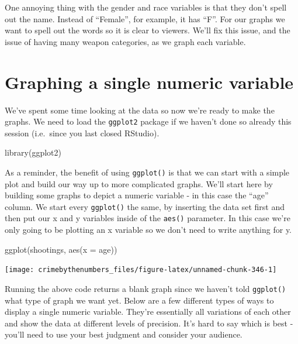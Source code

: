 \documentclass[
  a4paper,
]{krantz}
\makeatletter
\newenvironment{Shaded}{\begin{snugshade}}{\end{snugshade}}
\newcommand{\AttributeTok}[1]{\textcolor[rgb]{0.77,0.63,0.00}{#1}}
\newcommand{\FunctionTok}[1]{\textcolor[rgb]{0.00,0.00,0.00}{#1}}
\newcommand{\NormalTok}[1]{#1}
\newenvironment{kframe}{%
\medskip{}
\setlength{\fboxsep}{.8em}
 \def\at@end@of@kframe{}%
 \ifinner\ifhmode%
  \def\at@end@of@kframe{\end{minipage}}%
  \begin{minipage}{\columnwidth}%
 \fi\fi%
 \def\FrameCommand##1{\hskip\@totalleftmargin \hskip-\fboxsep
 \colorbox{shadecolor}{##1}\hskip-\fboxsep
     \hskip-\linewidth \hskip-\@totalleftmargin \hskip\columnwidth}%
 \MakeFramed {\advance\hsize-\width
   \@totalleftmargin\z@ \linewidth\hsize
   \@setminipage}}%
 {\par\unskip\endMakeFramed%
 \at@end@of@kframe}
\renewenvironment{Shaded}{\begin{kframe}}{\end{kframe}}
\makeatother
\begin{document}
One annoying thing with the gender and race variables is
that they don't spell out the name. Instead of ``Female'',
for example, it has ``F''. For our graphs we want to spell
out the words so it is clear to viewers. We'll fix this
issue, and the issue of having many weapon categories, as we
graph each variable.

\hypertarget{graphing-a-single-numeric-variable}{%
\section{Graphing a single numeric
variable}\label{graphing-a-single-numeric-variable}}

We've spent some time looking at the data so now we're ready
to make the graphs. We need to load the \texttt{ggplot2}
package if we haven't done so already this session
(i.e.~since you last closed RStudio).

\begin{Shaded}
\begin{Highlighting}[]
\FunctionTok{library}\NormalTok{(ggplot2)}
\end{Highlighting}
\end{Shaded}

As a reminder, the benefit of using \texttt{ggplot()} is
that we can start with a simple plot and build our way up to
more complicated graphs. We'll start here by building some
graphs to depict a numeric variable - in this case the
``age'' column. We start every \texttt{ggplot()} the same,
by inserting the data set first and then put our x and y
variables inside of the \texttt{aes()} parameter. In this
case we're only going to be plotting an x variable so we
don't need to write anything for y.

\begin{Shaded}
\begin{Highlighting}[]
\FunctionTok{ggplot}\NormalTok{(shootings, }\FunctionTok{aes}\NormalTok{(}\AttributeTok{x =}\NormalTok{ age))}
\end{Highlighting}
\end{Shaded}

\begin{center}\texttt{[image: crimebythenumbers\_files/figure-latex/unnamed-chunk-346-1]} \end{center}

Running the above code returns a blank graph since we
haven't told \texttt{ggplot()} what type of graph we want
yet. Below are a few different types of ways to display a
single numeric variable. They're essentially all variations
of each other and show the data at different levels of
precision. It's hard to say which is best - you'll need to
use your best judgment and consider your audience.
\end{document}
